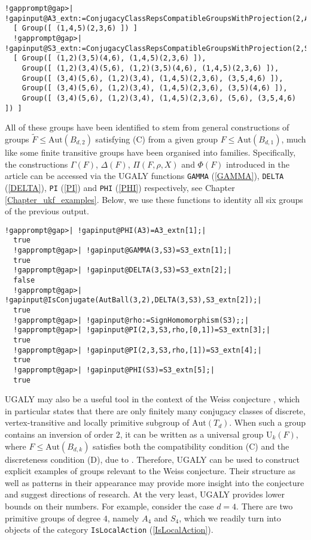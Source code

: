\documentclass[a4paper,11pt]{report}
\begin{document}
{{ 
\begin{Verbatim}[commandchars=!@|,fontsize=\small,frame=single,label=Example]
  !gapprompt@gap>| !gapinput@A3_extn:=ConjugacyClassRepsCompatibleGroupsWithProjection(2,A3);|
  [ Group([ (1,4,5)(2,3,6) ]) ]
  !gapprompt@gap>| !gapinput@S3_extn:=ConjugacyClassRepsCompatibleGroupsWithProjection(2,S3);|
  [ Group([ (1,2)(3,5)(4,6), (1,4,5)(2,3,6) ]), 
    Group([ (1,2)(3,4)(5,6), (1,2)(3,5)(4,6), (1,4,5)(2,3,6) ]), 
    Group([ (3,4)(5,6), (1,2)(3,4), (1,4,5)(2,3,6), (3,5,4,6) ]), 
    Group([ (3,4)(5,6), (1,2)(3,4), (1,4,5)(2,3,6), (3,5)(4,6) ]), 
    Group([ (3,4)(5,6), (1,2)(3,4), (1,4,5)(2,3,6), (5,6), (3,5,4,6) ]) ]
\end{Verbatim}
 All of these groups have been identified to stem from general constructions of
groups $\widetilde{F}\le\mathrm{Aut}(B_{d,2})$ satisfying (C) from a given group $F\le\mathrm{Aut}(B_{d,1})$, much like some finite transitive groups have been organised into families.
Specifically, the constructions $\Gamma(F)$, $\Delta(F)$, $\Pi(F,\rho,X)$ and $\Phi(F)$ introduced in the article \cite[Section 3.4]{Tor20} can be accessed via the \textsf{UGALY} functions \texttt{GAMMA} (\ref{GAMMA}), \texttt{DELTA} (\ref{DELTA}), \texttt{PI} (\ref{PI}) and \texttt{PHI} (\ref{PHI}) respectively, see Chapter \ref{Chapter_ukf_examples}. Below, we use these functions to identity all six groups of the previous
output. 

 
\begin{Verbatim}[commandchars=!@|,fontsize=\small,frame=single,label=Example]
  !gapprompt@gap>| !gapinput@PHI(A3)=A3_extn[1];|
  true
  !gapprompt@gap>| !gapinput@GAMMA(3,S3)=S3_extn[1];|
  true
  !gapprompt@gap>| !gapinput@DELTA(3,S3)=S3_extn[2];|
  false
  !gapprompt@gap>| !gapinput@IsConjugate(AutBall(3,2),DELTA(3,S3),S3_extn[2]);|
  true
  !gapprompt@gap>| !gapinput@rho:=SignHomomorphism(S3);;|
  !gapprompt@gap>| !gapinput@PI(2,3,S3,rho,[0,1])=S3_extn[3];|
  true
  !gapprompt@gap>| !gapinput@PI(2,3,S3,rho,[1])=S3_extn[4];|
  true
  !gapprompt@gap>| !gapinput@PHI(S3)=S3_extn[5];|
  true
\end{Verbatim}
 \textsf{UGALY} may also be a useful tool in the context of the Weiss conjecture \cite{Wei78}, which in particular states that there are only finitely many conjugacy
classes of discrete, vertex-transitive and locally primitive subgroup of $\mathrm{Aut}(T_{d})$. When such a group contains an inversion of order $2$, it can be written as a universal group $\mathrm{U}_{k}(F)$, where $F\le\mathrm{Aut}(B_{d,k})$ satisfies both the compatibility condition (C) and the discreteness condition
(D), due to \cite[Corollary 4.38]{Tor20}. Therefore, \textsf{UGALY} can be used to construct explicit examples of groups relevant to the Weiss
conjecture. Their structure as well as patterns in their appearance may
provide more insight into the conjecture and suggest directions of research.
At the very least, \textsf{UGALY} provides lower bounds on their numbers. For example, consider the case $d=4$. There are two primitive groups of degree $4$, namely $A_{4}$ and $S_{4}$, which we readily turn into objects of the category \texttt{IsLocalAction} (\ref{IsLocalAction}). 

}}
\end{document}
